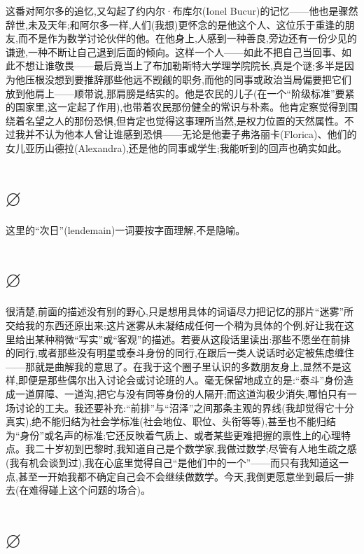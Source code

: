 这番对阿尔多的追忆,又勾起了约内尔·布库尔(Ionel Bucur)的记忆——他也是骤然辞世,未及天年;和阿尔多一样,人们(我想)更怀念的是他这个人、这位乐于重逢的朋友,而不是作为数学讨论伙伴的他。在他身上,人感到一种善良,旁边还有一份少见的谦逊,一种不断让自己退到后面的倾向。这样一个人——如此不把自己当回事、如此不想让谁敬畏——最后竟当上了布加勒斯特大学理学院院长,真是个谜;多半是因为他压根没想到要推辞那些他远不觊觎的职务,而他的同事或政治当局偏要把它们放到他肩上——顺带说,那肩膀是结实的。他是农民的儿子(在一个“阶级标准”要紧的国家里,这一定起了作用),也带着农民那份健全的常识与朴素。他肯定察觉得到围绕着名望之人的那份恐惧,但肯定也觉得这事理所当然,是权力位置的天然属性。不过我并不认为他本人曾让谁感到恐惧——无论是他妻子弗洛丽卡(Florica)、他们的女儿亚历山德拉(Alexandra),还是他的同事或学生;我能听到的回声也确实如此。

\section{$\varnothing$}

这里的“次日”(lendemain)一词要按字面理解,不是隐喻。

\section{$\varnothing$}

很清楚,前面的描述没有别的野心,只是想用具体的词语尽力把记忆的那片“迷雾”所交给我的东西还原出来;这片迷雾从未凝结成任何一个稍为具体的个例,好让我在这里给出某种稍微“写实”或“客观”的描述。若要从这段话里读出:那些不愿坐在前排的同行,或者那些没有明星或泰斗身份的同行,在跟后一类人说话时必定被焦虑缠住——那就是曲解我的意思了。在我于这个圈子里认识的多数朋友身上,显然不是这样,即便是那些偶尔出入讨论会或讨论班的人。毫无保留地成立的是:“泰斗”身份造成一道屏障、一道沟,把它与没有同等身份的人隔开;而这道沟极少消失,哪怕只有一场讨论的工夫。我还要补充:“前排”与“沼泽”之间那条主观的界线(我却觉得它十分真实),绝不能归结为社会学标准(社会地位、职位、头衔等等),甚至也不能归结为“身份”或名声的标准;它还反映着气质上、或者某些更难把握的禀性上的心理特点。我二十岁初到巴黎时,我知道自己是个数学家,我做过数学;尽管有人地生疏之感(我有机会谈到过),我在心底里觉得自己“是他们中的一个”——而只有我知道这一点,甚至一开始我都不确定自己会不会继续做数学。今天,我倒更愿意坐到最后一排去(在难得碰上这个问题的场合)。

\section{$\varnothing$}

